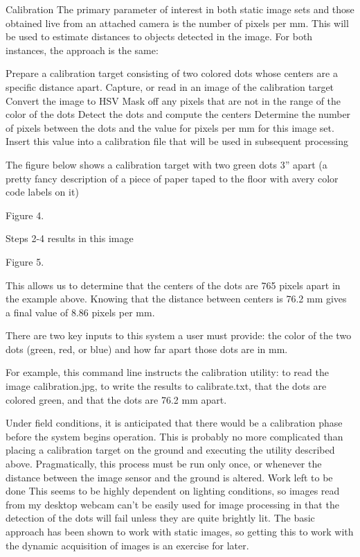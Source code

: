 \documentclass[letterpaper]{article}
\begin{document}
Calibration
The primary parameter of interest in both static image sets and those obtained live from an attached camera is the number of pixels per mm. This will be used to estimate distances to objects detected in the image.  For both instances, the approach is the same:

Prepare a calibration target consisting of two colored dots whose centers are a specific distance apart.
Capture, or read in an image of the calibration target
Convert the image to HSV
Mask off any pixels that are not in the range of the color of the dots
Detect the dots and compute the centers
Determine the number of pixels between the dots and the value for pixels per mm for this image set.
Insert this value into a calibration file that will be used in subsequent processing

The figure below shows a calibration target with two green dots 3” apart (a pretty fancy description of a piece of paper taped to the floor with avery color code labels on it)

Figure 4. 

Steps 2-4 results in this image


Figure 5. 

This allows us to determine that the centers of the dots are 765 pixels apart in the example above. Knowing that the distance between centers is 76.2 mm gives a final value of 8.86 pixels per mm.

There are two key inputs to this system a user must provide: the color of the two dots (green, red, or blue) and how far apart those dots are in mm.

For example, this command line instructs the calibration utility: 
to read the image calibration.jpg, 
to write the results to calibrate.txt, 
that the dots are colored green, and 
that the dots are 76.2 mm apart.


Under field conditions, it is anticipated that there would be a calibration phase before the system begins operation. This is probably no more complicated than placing a calibration target on the ground and executing the utility described above. Pragmatically, this process must be run only once, or whenever the distance between the image sensor and the ground is altered.
Work left to be done
This seems to be highly dependent on lighting conditions, so images read from my desktop webcam can’t be easily used for image processing in that the detection of the dots will fail unless they are quite brightly lit. The basic approach has been shown to work with static images, so getting this to work with the dynamic acquisition of images is an exercise for later.
\end{document}
